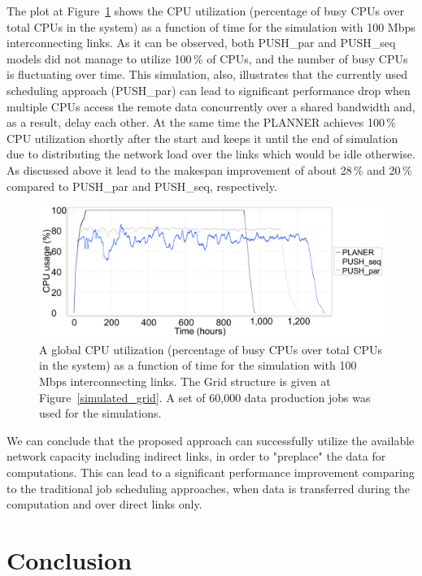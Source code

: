 \documentclass{svjour3}                     %
\begin{document}
The plot at Figure~\ref{multi_cpu_consumption} shows the CPU utilization (percentage of busy CPUs over total CPUs in the system) as a function of time for the simulation with 100 Mbps interconnecting links. As it can be observed, both PUSH\_par and PUSH\_seq models did not manage to utilize 100\,\% of CPUs, and the number of busy CPUs is fluctuating over time. This simulation, also, illustrates that the currently used scheduling approach (PUSH\_par) can lead to significant performance drop when multiple CPUs access the remote data concurrently over a shared bandwidth and, as a result, delay each other. At the same time the PLANNER achieves 100\,\% CPU utilization shortly after the start and keeps it until the end of simulation due to distributing the network load over the links which would be idle otherwise. As discussed above it lead to the makespan improvement of about 28\,\% and 20\,\% compared to PUSH\_par and PUSH\_seq, respectively.
\begin{figure}
  \begin{center}
    \includegraphics [trim= 0mm 00mm 0mm 00mm , clip,width=1\textwidth]{pic/3models_link01.png}
    \caption{A global CPU utilization (percentage of busy CPUs over total CPUs in the system) as a function of time for the simulation with 100 Mbps interconnecting links. The Grid structure is given at Figure~\ref{simulated_grid}. A set of 60,000 data production jobs was used for the simulations.}
      \label{multi_cpu_consumption}	
  \end{center}  
\end{figure}

We can conclude that the proposed approach can successfully utilize the available network capacity including indirect links, in order to "preplace" the data for computations. This can lead to a significant performance improvement comparing to the traditional job scheduling approaches, when data is transferred during the computation and over direct links only. 

\section{Conclusion}
\label{Conclusion}
\end{document}
